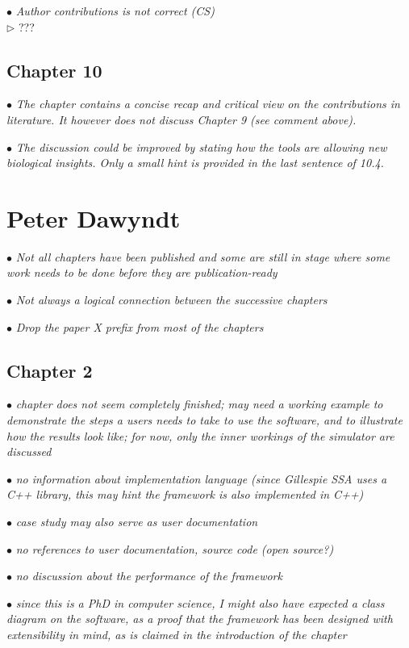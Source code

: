 \documentclass[10pt]{article}
\newcommand{\exam}[2][\  ]{\hspace{0pt}\marginpar{\color{red}#1}$\bullet$ \textit{#2}}
\newcommand{\imp}[1]{{\color{red} #1}}
\newcommand{\nimp}[1]{{\color{gray} #1}}
\newcommand{\answ}[1]{{\color{blue} $\triangleright$ #1}}
\newcommand{\bigexclaim}{\raisebox{-0.1em}{\BigTriangleUp}\hspace{-0.32em}\llap{\small\textbf{!}}\hspace{0.32em}}
\newcommand{\tagimp}{\bigexclaim}
\newcommand{\tagtime}{{\Large $\hourglass$}}
\begin{document}
{{\exam{Author contributions is not correct (CS)} \\
\answ{???}


\subsection{Chapter 10}

\exam{\nimp{The chapter contains a concise recap and critical view on the contributions in
		literature.} It however does not discuss Chapter 9 (see comment above).}


\exam{\imp{The discussion could be improved by stating how the tools are allowing new
		biological insights.} Only a small hint is provided in the last sentence of 10.4.}


\section{Peter Dawyndt}

\exam{Not all chapters have been published and some are still in stage where some work needs to be done before they are publication-ready}

\exam{Not always a logical connection between the successive chapters}


\exam{Drop the paper X prefix from most of the chapters}

\subsection{Chapter 2}


\exam[\tagimp \tagtime]{chapter does not seem completely finished; \imp{may need a working example to demonstrate the steps
	a users needs to take to use the software, and to illustrate how the results look like}; for now, only
	the inner workings of the simulator are discussed}

\exam{no information about implementation language
	(since Gillespie SSA uses a C++ library, this may hint the framework is also implemented in C++)}

\exam{case
	study may also serve as user documentation}

\exam{no references to user documentation, source code
	(open source?)}

\exam{no discussion about the performance of the framework}

\exam[\tagtime]{since this is a PhD in
	computer science, I might also have expected a class diagram on the software, as a proof that the
	framework has been designed with extensibility in mind, as is claimed in the introduction of the chapter}

}}
\end{document}
